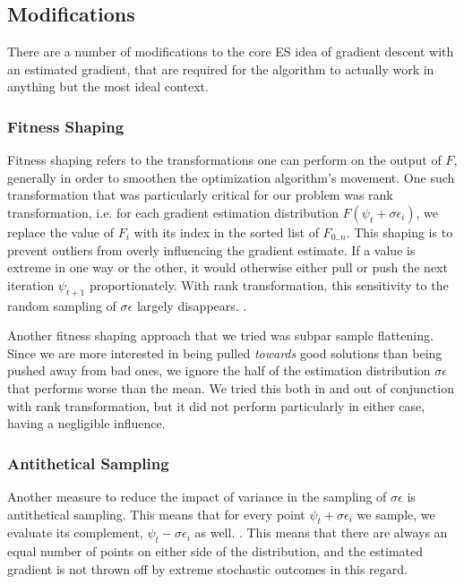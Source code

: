 \subsection{Modifications}
There are a number of modifications to the core ES idea of gradient descent with an estimated gradient, that are required for the algorithm to actually work in anything but the most ideal context. 

\subsubsection{Fitness Shaping}
Fitness shaping refers to the transformations one can perform on the output of $F$, generally in order to smoothen the optimization algorithm's movement. One such transformation that was particularly critical for our problem was rank transformation, i.e. for each gradient estimation distribution $F(\psi_t + \sigma\epsilon_i)$, we replace the value of $F_i$ with its index in the sorted list of $F_{0..n}$. This shaping is to prevent outliers from overly influencing the gradient estimate. If a value is extreme in one way or the other, it would otherwise either pull or push the next iteration $\psi_{t+1}$ proportionately. With rank transformation, this sensitivity to the random sampling of $\sigma\epsilon$ largely disappears. \cite{Wierstra2011}. 

Another fitness shaping approach that we tried was subpar sample flattening. Since we are more interested in being pulled \textit{towards} good solutions than being pushed away from bad ones, we ignore the half of the estimation distribution $\sigma\epsilon$ that performs worse than the mean. We tried this both in and out of conjunction with rank transformation, but it did not perform particularly in either case, having a negligible influence.

\subsubsection{Antithetical Sampling}
Another measure to reduce the impact of variance in the sampling of $\sigma\epsilon$ is antithetical sampling. This means that for every point $\psi_t + \sigma\epsilon_i$ we sample, we evaluate its complement, $\psi_t - \sigma\epsilon_i$ as well. \cite{Salimans2017}. This means that there are always an equal number of points on either side of the distribution, and the estimated gradient is not thrown off by extreme stochastic outcomes in this regard.


